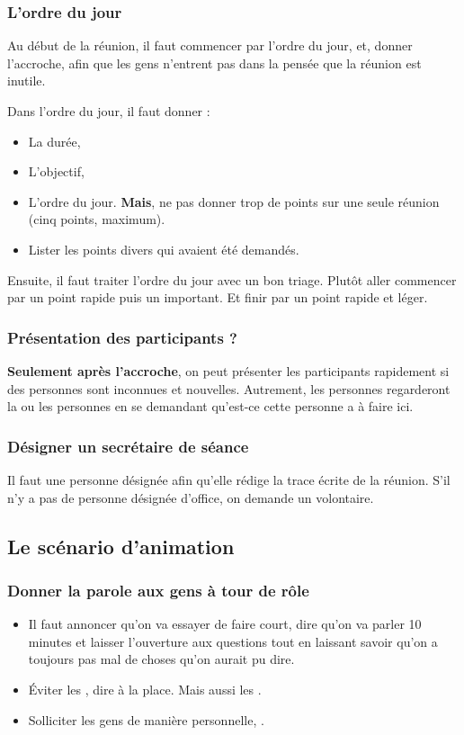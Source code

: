 \subsubsection{L'ordre du jour}
Au début de la réunion, il faut commencer par l'ordre du jour, et, donner l'accroche, afin que les gens n'entrent pas dans la pensée que la réunion est inutile.

Dans l'ordre du jour, il faut donner :
\begin{itemize}
    \item La durée,
    \item L'objectif,
    \item L'ordre du jour. \textbf{Mais}, ne pas donner trop de points sur une seule réunion (cinq points, maximum).
    \item Lister les points divers qui avaient été demandés.
\end{itemize}

Ensuite, il faut traiter l'ordre du jour avec un bon triage. Plutôt aller commencer par un point rapide puis un important. Et finir par un point rapide et léger.

\subsubsection{Présentation des participants ?}
\textbf{Seulement après l'accroche}, on peut présenter les participants rapidement si des personnes sont inconnues et nouvelles. Autrement, les personnes regarderont la ou les personnes en se demandant qu'est-ce cette personne a à faire ici.

\subsubsection{Désigner un secrétaire de séance}
Il faut une personne désignée afin qu'elle rédige la trace écrite de la réunion. S'il n'y a pas de personne désignée d'office, on demande un volontaire.

\subsection{Le scénario d'animation}
\subsubsection{Donner la parole aux gens à tour de rôle}
\begin{itemize}
    \item Il faut annoncer qu'on va essayer de faire court, dire qu'on va parler 10 minutes et laisser l'ouverture aux questions tout en laissant savoir qu'on a toujours pas mal de choses qu'on aurait pu dire.
    \item Éviter les , dire  à la place. Mais aussi les .
    \item Solliciter les gens de manière personnelle, .
\end{itemize}

